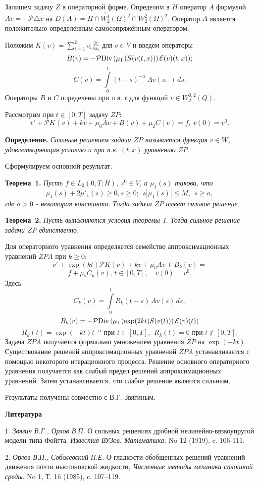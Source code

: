 Запишем задачу  $Z$ в операторной форме.
 Определим в $H$ оператор $A$ формулой $Av=-{\mathcal{P}}\triangle v$ на $D(A)=H \cap \stackrel{\circ}{W_2^1}(\Omega)^2\cap {W_2^2}(\Omega)^2$. Оператор $A$ является  положительно определённым самосопряжённым оператором.

Положим
$K(v)=\sum_{i=1}^2 v_i\frac{\partial v}{\partial x_i}$ для $v\in V$ и введём операторы
$$
B(v) = - {\mathcal{P}}{\rm Div} \, (\mu_1\,(S(v(t,x)))\,\mathcal{E}(v)(t,x));
$$
$$ C(v)=\int\limits_{0}^t(t-s)^{-\alpha}\,A v(s, \cdot )\,ds.
$$
Операторы $B$ и
$C$ определены при п.в. $t$ для функций $v\in W_2^{0,2}(Q)$.

Рассмотрим  при  $ t\in[0,T]$ задачу $ZP$:
$$
v'+\mathcal{P}K_{}( v)+ k v+\mu_0 Av +B(v)+\mu_2C(v)= f,\    v(0)=v^0.
$$


\textbf{Определение.} {\it
Сильным решением задачи $ZP$ называется функция $v\in W$, удовлетворяющая условию  и при п.в. $(t,x)$ уравнению   $ZP$.}

Сформулируем основной результат.

\textbf{Теорема~1.} {\it Пусть  $f\in L_2 (0,T;H)$, $v^0\in V$, а $\mu_1(s)$ такова, что
$$
 \mu_1(s)+2\mu'_1(s)\ge 0, s\ge 0; \ \ s|\mu_1(s)|\le M,\ \ s\ge a,
$$
где $a>0$ - некоторая константа. Тогда задача  $ZP$  имеет сильное решение.}


\textbf{Теорема~2.} {\it Пусть  выполняются условия теоремы 1.
Тогда сильное решение задачи  $ZP$  единственно.}

 Для операторного уравнения
определяется семейство аппроксимационных уравнений $ZPA$ при $k\ge 0$:
$$
v'+\exp(kt)\mathcal{P}K(v)+ k v+\mu_0 Av +B_k(v)=
$$
$$
f+\mu_2 C_k(v),\, t\in[0,T], \quad   v(0)=v^0.
$$
Здесь
$$
C_k(v)=\int\limits_{0}^tR_k(t-s)\,A v(s)\,ds,
$$
$$
B_k(v) = - {\mathcal{P}}{\rm Div} \, (\mu_1\,(\exp(2kt)S(v(t)))\,\mathcal{E}(v)(t))
$$
$$
R_k(t)=\exp(-kt)t^{-\alpha} \mbox{ при  } t\in[0,T],\ \  R_k(t)=0  \mbox{ при  } t\notin[0,T].
$$
 Задача $ZPA$  получается  формально умножением уравнения $ZP$  на  $\exp(-kt)$.
 Существование
решений аппроксимационных уравнений $ZPA$ устанавливается с помощью
некоторого итерационного процесса. Решение основного операторного уравнения получается как
слабый предел решений аппроксимационных уравнений. Затем устанавливается, что слабое решение является сильным.




Результаты получены совместно с В.Г. Звягиным.



\smallskip \centerline {\bf Литература} \nopagebreak

1. {\it Звягин В.Г., Орлов В.П.} О сильных решениях дроб\-ной не\-линейно-вязкоупругой модели типа Фойгта.  {\it Известия \newline ВУЗов. Математика.} No 12 (1919), c. 106-111.

2. {\it Орлов В.П., Соболевский П.Е.} О гладкости обоб\-щен\-ных решений уравнений движения почти ньютоновской  \newline жидкости, {\it Численные методы механики сплошной среды}.  \newline No 1, Т. 16  (1985), c. 107--119.


